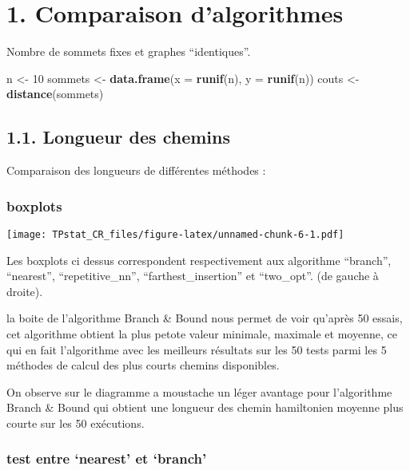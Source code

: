 \documentclass[
]{article}
\newenvironment{Shaded}{\begin{snugshade}}{\end{snugshade}}
\newcommand{\DataTypeTok}[1]{\textcolor[rgb]{0.13,0.29,0.53}{#1}}
\newcommand{\DecValTok}[1]{\textcolor[rgb]{0.00,0.00,0.81}{#1}}
\newcommand{\KeywordTok}[1]{\textcolor[rgb]{0.13,0.29,0.53}{\textbf{#1}}}
\newcommand{\NormalTok}[1]{#1}
\newcommand{\StringTok}[1]{\textcolor[rgb]{0.31,0.60,0.02}{#1}}
\begin{document}
\hypertarget{comparaison-dalgorithmes}{%
\section{1. Comparaison d'algorithmes}\label{comparaison-dalgorithmes}}

Nombre de sommets fixes et graphes ``identiques''.

\begin{Shaded}
\begin{Highlighting}[]
\NormalTok{      n <-}\StringTok{ }\DecValTok{10}
\NormalTok{sommets <-}\StringTok{ }\KeywordTok{data.frame}\NormalTok{(}\DataTypeTok{x =} \KeywordTok{runif}\NormalTok{(n), }\DataTypeTok{y =} \KeywordTok{runif}\NormalTok{(n))}
\NormalTok{  couts <-}\StringTok{ }\KeywordTok{distance}\NormalTok{(sommets)}
\end{Highlighting}
\end{Shaded}

\hypertarget{longueur-des-chemins}{%
\subsection{1.1. Longueur des chemins}\label{longueur-des-chemins}}

Comparaison des longueurs de différentes méthodes :

\hypertarget{boxplots}{%
\subsubsection{boxplots}\label{boxplots}}

\texttt{[image: TPstat\_CR\_files/figure-latex/unnamed-chunk-6-1.pdf]}

Les boxplots ci dessus correspondent respectivement aux algorithme
``branch'', ``nearest'', ``repetitive\_nn'', ``farthest\_insertion'' et
``two\_opt''. (de gauche à droite).

la boite de l'algorithme Branch \& Bound nous permet de voir qu'après 50
essais, cet algorithme obtient la plus petote valeur minimale, maximale
et moyenne, ce qui en fait l'algorithme avec les meilleurs résultats sur
les 50 tests parmi les 5 méthodes de calcul des plus courts chemins
disponibles.

On observe sur le diagramme a moustache un léger avantage pour
l'algorithme Branch \& Bound qui obtient une longueur des chemin
hamiltonien moyenne plus courte sur les 50 exécutions.

\hypertarget{test-entre-nearest-et-branch}{%
\subsubsection{test entre `nearest' et
`branch'}\label{test-entre-nearest-et-branch}}
\end{document}
